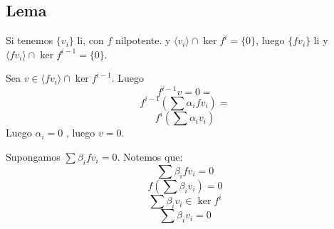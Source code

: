 \documentclass{article}
\begin{document}
\subsection*{Lema}
Si tenemos $\{v_i\}$ li, con $f$ nilpotente. y $\langle v_i \rangle \cap \ker f^i = \{0\}$, luego $\{fv_i\}$ li y $\langle fv_i \rangle \cap \ker f^{i-1} = \{0\}$.

Sea $v \in \langle fv_i \rangle \cap \ker f^{i-1}$. Luego
\[
	f^{i-1} v = 0 =
\]
\[
	f^{i-1} \left(\sum \alpha_i fv_i\right) =
\]
\[
	f^i \left(\sum \alpha_i v_i\right)
\]
Luego $\alpha_i = 0$ , luego $v = 0$.

Supongamos $\sum \beta_i fv_i = 0$. Notemos que:
\[
	\sum \beta_i fv_i = 0
\]
\[
	f \left(\sum \beta_i v_i \right) = 0
\]
\[
	\sum \beta_i v_i \in \ker f^i
\]
\[
	\sum \beta_i v_i = 0
\]
\end{document}
